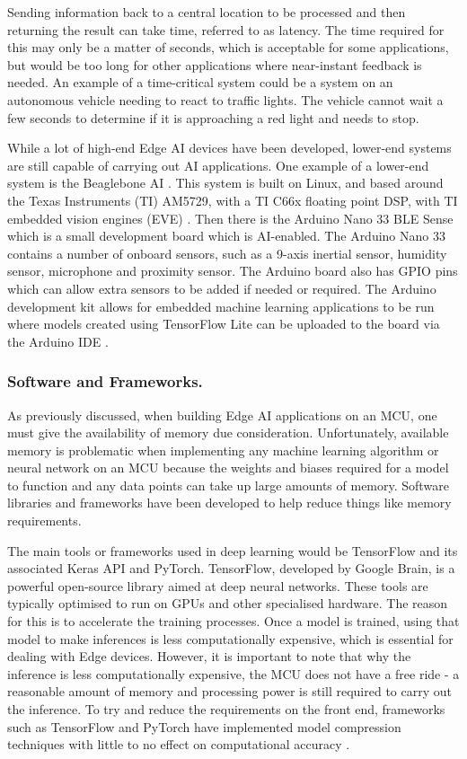 \documentclass{svproc}
\begin{document}
Sending information back to a central location to be processed and then returning the result can take time, referred to as latency. 
The time required for this may only be a matter of seconds, which is acceptable for some applications, but would be too long for other 
applications where near-instant feedback is needed. An example of a time-critical system could be a system on an autonomous vehicle 
needing to react to traffic lights. The vehicle cannot wait a few seconds to determine if it is approaching a red light and needs to stop. 

While a lot of high-end Edge AI devices have been developed, lower-end systems are still capable of carrying out AI applications. 
One example of a lower-end system is the Beaglebone AI \cite{b8}. This system is built on Linux, and based around the Texas Instruments (TI) 
AM5729, with a TI C66x floating point DSP, with TI embedded vision engines (EVE) \cite{b9}. Then there is the Arduino Nano 33 BLE Sense 
which is a small development board which is AI-enabled. The Arduino Nano 33 contains a number of onboard sensors, such as a 9-axis 
inertial sensor, humidity sensor, microphone and proximity sensor. The Arduino board also has GPIO pins which can allow extra sensors 
to be added if needed or required. The Arduino development kit allows for embedded machine learning applications to be run where models 
created using TensorFlow Lite can be uploaded to the board via the Arduino IDE \cite{b10}.

\subsubsection{Software and Frameworks.}
As previously discussed, when building Edge AI applications on an MCU, one must give the availability of memory due consideration. 
Unfortunately, available memory is problematic when implementing any machine learning algorithm or neural network on an MCU because 
the weights and biases required for a model to function and any data points can take up large amounts of memory. Software libraries and 
frameworks have been developed to help reduce things like memory requirements.

The main tools or frameworks used in deep learning would be TensorFlow and its associated Keras API and PyTorch. TensorFlow, developed by Google Brain, 
is a powerful open-source library aimed at deep neural networks. These tools are typically optimised to run on GPUs and other specialised hardware. 
The reason for this is to accelerate the training processes. Once a model is trained, using that model to make inferences is less computationally 
expensive, which is essential for dealing with Edge devices. However, it is important to note that why the inference is less computationally expensive, 
the MCU does not have a free ride - a reasonable amount of memory and processing power is still required to carry out the inference. 
To try and reduce the requirements on the front end, frameworks such as TensorFlow and PyTorch have implemented model compression techniques 
with little to no effect on computational accuracy \cite{b9}. 
\end{document}
